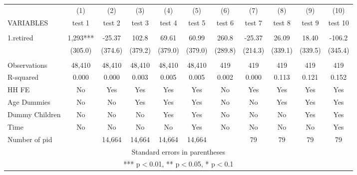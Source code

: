 \begin{tabular}{lcccccccccc} \hline
 & (1) & (2) & (3) & (4) & (5) & (6) & (7) & (8) & (9) & (10) \\
VARIABLES & test 1 & test 2 & test 3 & test 4 & test 5 & test 6 & test 7 & test 8 & test 9 & test 10 \\ \hline
 &  &  &  &  &  &  &  &  &  &  \\
1.retired & 1,293*** & -25.37 & 102.8 & 69.61 & 60.99 & 260.8 & -25.37 & 26.09 & 18.40 & -106.2 \\
 & (305.0) & (374.6) & (379.2) & (379.0) & (379.0) & (289.8) & (214.3) & (339.1) & (339.5) & (345.4) \\
 &  &  &  &  &  &  &  &  &  &  \\
Observations & 48,410 & 48,410 & 48,410 & 48,410 & 48,410 & 419 & 419 & 419 & 419 & 419 \\
R-squared & 0.000 & 0.000 & 0.003 & 0.005 & 0.005 & 0.002 & 0.000 & 0.113 & 0.121 & 0.152 \\
HH FE & No & Yes & Yes & Yes & Yes & No & Yes & Yes & Yes & Yes \\
Age Dummies & No & No & Yes & Yes & Yes & No & No & Yes & Yes & Yes \\
Dummy Children & No & No & No & Yes & Yes & No & No & No & Yes & Yes \\
Time & No & No & No & No & Yes & No & No & No & No & Yes \\
 Number of pid &  & 14,664 & 14,664 & 14,664 & 14,664 &  & 79 & 79 & 79 & 79 \\ \hline
\multicolumn{11}{c}{ Standard errors in parentheses} \\
\multicolumn{11}{c}{ *** p$<$0.01, ** p$<$0.05, * p$<$0.1} \\
\end{tabular}
